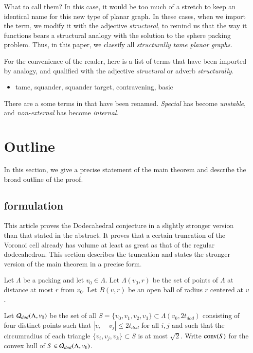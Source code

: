 What to call them?  In this case, it would be too much of a stretch
to keep an identical name for this new type of planar graph.
In these cases, when we import the term, we modify it with
the adjective {\it structural}, to remind us that the way it functions 
bears a structural
analogy with the solution to the sphere
packing problem.  Thus, in this paper, we classify all
{\it structurally tame planar graphs}.

For the convenience of the reader, here is a list of terms that
have been imported by analogy, and qualified with the adjective
{\it structural} or adverb {\it structurally}.

\begin{itemize}
\item tame, squander, squander target, contravening, basic
\end{itemize}

There are a some terms in \cite{arx} that have been renamed.
{\it Special} has become {\it unstable}, and {\it non-external} has
become {\it internal}.


\section{Outline}

In this section, we give a precise statement of the main theorem
and describe the broad outline of the proof.


\subsection{formulation}\label{sec:form}

This article proves the Dodecahedral conjecture in a slightly
stronger version than that stated in the abstract.  It proves
that a certain truncation of the Voronoi cell already has volume
at least as great as that of the regular dodecahedron.  This
section describes the truncation and states the stronger version
of the main theorem in a precise form.

Let $\Lambda$ be a packing and let $v_0\in\Lambda$.
Let $\Lambda(v_0,r)$ be the set of points of $\Lambda$ at distance at most $r$ from $v_0$.
Let $B(v,r)$ be an open ball
of radius $r$ centered at $v$.  

Let ${\mathcal Q}_{dod}(\Lambda,v_0)$ 
be the set of all $S=\{v_0,v_1,v_2,v_3\}\subset\Lambda(v_0,2t_{dod})$
consisting of four distinct points such that $|v_i-v_j|\le 2t_{dod}$ for all $i,j$
and such that the circumradius of each triangle $\{v_i,v_j,v_k\}\subset S$ is at most
$\sqrt2$.   Write ${\operatorname{conv}}(S)$ for the convex hull of $S\in{\mathcal Q}_{dod}(\Lambda,v_0)$. 


